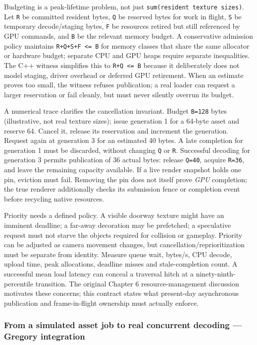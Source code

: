 Budgeting is a peak-lifetime problem, not just \texttt{sum(resident\ texture\ sizes)}. Let \texttt{R} be committed resident bytes, \texttt{Q} be reserved bytes for work in flight, \texttt{S} be temporary decode/staging bytes, \texttt{F} be resources retired but still referenced by GPU commands, and \texttt{B} be the relevant memory budget. A conservative admission policy maintains \texttt{R+Q+S+F\ \textless{}=\ B} for memory classes that share the same allocator or hardware budget; separate CPU and GPU heaps require separate inequalities. The C++ witness simplifies this to \texttt{R+Q\ \textless{}=\ B} because it deliberately does not model staging, driver overhead or deferred GPU retirement. When an estimate proves too small, the witness refuses publication; a real loader can request a larger reservation or fail cleanly, but must never silently overrun its budget.

A numerical trace clarifies the cancellation invariant. Budget \texttt{B=128} bytes (illustrative, not real texture sizes); issue generation 1 for a 64-byte asset and reserve 64. Cancel it, release its reservation and increment the generation. Request again at generation 3 for an estimated 40 bytes. A late completion for generation 1 must be discarded, without changing \texttt{Q} or \texttt{R}. Successful decoding for generation 3 permits publication of 36 actual bytes: release \texttt{Q=40}, acquire \texttt{R=36}, and leave the remaining capacity available. If a live render snapshot holds one pin, eviction must fail. Removing the pin does not itself prove \emph{GPU} completion; the true renderer additionally checks its submission fence or completion event before recycling native resources.

Priority needs a defined policy. A visible doorway texture might have an imminent deadline; a far-away decoration may be prefetched; a speculative request must not starve the objects required for collision or gameplay. Priority can be adjusted as camera movement changes, but cancellation/reprioritization must be separate from identity. Measure queue wait, bytes/s, CPU decode, upload time, peak allocations, deadline misses and stale-completion count. A successful mean load latency can conceal a traversal hitch at a ninety-ninth-percentile transition. The original Chapter 6 resource-management discussion motivates these concerns; this contract states what present-day asynchronous publication and frame-in-flight ownership must actually enforce.

\subsubsection{From a simulated asset job to real concurrent decoding --- Gregory integration}\label{06-engine-ii-ch027-from-a-simulated-asset-job-to-real-concurrent-decoding-gregory-integration}

